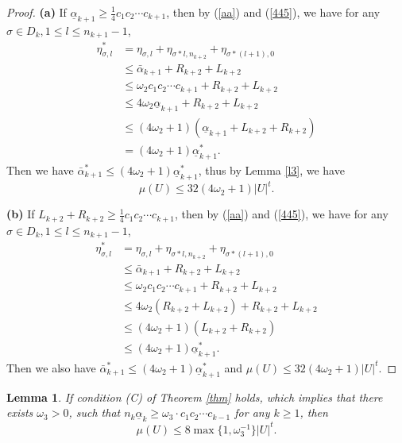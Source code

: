 \documentclass[reqno]{amsart}
\theoremstyle{plain}
\newtheorem{lem}{Lemma}
\theoremstyle{definition}
\theoremstyle{remark}
\numberwithin{equation}{section} \DeclareMathOperator\intr{int}
\begin{document}
\begin{proof}
\textbf{(a)} If $\underline{\alpha}_{k+1}\ge \frac{1}{4}c_1c_2\cdots c_{k+1}$,  then by (\ref{aa}) and (\ref{445}), we have for any $\sigma \in D_k,  1\le l \le n_{k+1}-1$,
\begin{equation}
\begin{aligned}
\eta^*_{\sigma,l} & = \eta_{\sigma,l}+\eta_{\sigma*l,n_{k+2}}+\eta_{\sigma*(l+1),0}\\
&\le \bar{\alpha}_{k+1}+R_{k+2}+L_{k+2}   \\
&\le \omega_2c_1c_2\cdots c_{k+1}+R_{k+2}+L_{k+2}\\
&\le 4\omega_2\underline{\alpha}_{k+1}+R_{k+2}+L_{k+2}\\
&\le (4\omega_2+1)(\underline{\alpha}_{k+1}+L_{k+2}+R_{k+2})\\
&=(4\omega_2+1)\underline{\alpha}^*_{k+1}.\nonumber
\end{aligned}
\end{equation}
Then we have $\bar{\alpha}^*_{k+1}\le (4\omega_2+1)\underline{\alpha}^*_{k+1}$, thus by Lemma \ref{l3}, we have $$\mu(U)\le 32(4\omega_2+1)\left | U \right |^t.$$

\textbf{(b)} If $L_{k+2}+R_{k+2}\ge \frac{1}{4}c_1c_2\cdots c_{k+1}$,  then by (\ref{aa}) and (\ref{445}), we have for any $\sigma \in D_k,  1\le l \le n_{k+1}-1$,
\begin{equation}
\begin{aligned}
\eta^*_{\sigma,l} & = \eta_{\sigma,l}+\eta_{\sigma*l,n_{k+2}}+\eta_{\sigma*(l+1),0}\\
&\le \bar{\alpha}_{k+1}+R_{k+2}+L_{k+2}   \\
&\le \omega_2c_1c_2\cdots c_{k+1}+R_{k+2}+L_{k+2}\\
&\le 4\omega_2(R_{k+2}+L_{k+2})+R_{k+2}+L_{k+2}\\
&\le (4\omega_2+1)(L_{k+2}+R_{k+2})\\
&\le (4\omega_2+1)\underline{\alpha}^*_{k+1}.\nonumber
\end{aligned}
\end{equation}
Then we also have $\bar{\alpha}^*_{k+1}\le (4\omega_2+1)\underline{\alpha}^*_{k+1}$ and $\mu(U)\le 32(4\omega_2+1)\left | U \right |^t.$
\end{proof}

\begin{lem}\label{l5}
If condition \rm{(C)} of Theorem \rm{\ref{thm}} holds,
which implies that there exists $\omega_3>0$, such that $n_{k}\underline\alpha_{k}\ge \omega_3\cdot c_1c_2\cdots c_{k-1}$ for any $k\ge 1$, then
\begin{equation}
\mu(U)\le 8\max\{1,\omega_3^{-1}\}\left | U \right |^t.
\end{equation}

\end{lem}
\end{document}
